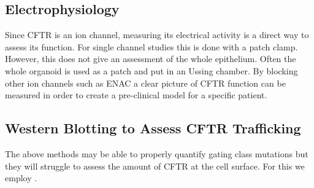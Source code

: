 \subsection{Electrophysiology}
Since CFTR is an ion channel, measuring its electrical activity is a direct way to assess its function. For single channel studies this is done with a patch clamp. However, this does not give an assessment of the whole epithelium. Often the whole organoid is used as a patch and put in an Ussing chamber. By blocking other ion channels such as ENAC a clear picture of CFTR function can be measured in order to create a pre-clinical model for a specific patient.

\subsection{Western Blotting to Assess CFTR Trafficking}
The above methods may be able to properly quantify gating class mutations but they will struggle to assess the amount of CFTR at the cell surface. For this we employ .
